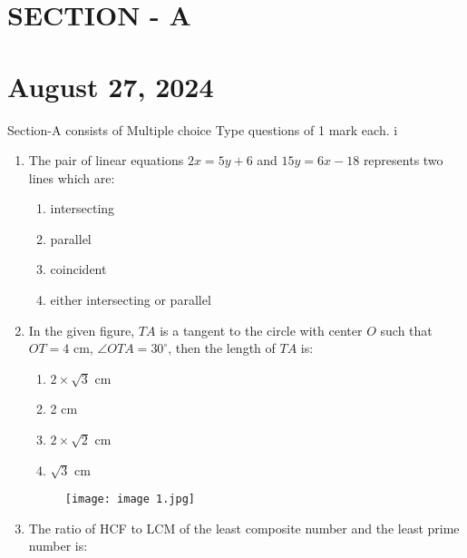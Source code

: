 \documentclass{article}
\begin{document}
\begin{center}
    \section*{SECTION - A}
    \section*{August 27, 2024}
\end{center}

\noindent Section-A consists of Multiple choice Type questions of 1 mark each.
i
\begin{enumerate}
    \item The pair of linear equations $2x = 5y + 6$ and $15y = 6x - 18$ represents two lines which are:
    \begin{enumerate}
        \item intersecting
        \item parallel
        \item coincident
        \item either intersecting or parallel
    \end{enumerate}
    
    \item In the given figure, $TA$ is a tangent to the circle with center $O$ such that $OT = 4$ cm, $\angle OTA = 30^{\circ}$, then the length of $TA$ is:
    \begin{enumerate}
        \item $2 \times \sqrt{3}$ cm
        \item 2 cm
        \item $2 \times \sqrt{2}$ cm
        \item $\sqrt{3}$ cm
    \end{enumerate}
\begin{figure}[h!]
\centering
\texttt{[image: image 1.jpg]}
\label{fig:image1}
\end{figure}

\item The ratio of HCF to LCM of the least composite number and the least prime number is:


\end{enumerate}
\end{document}
